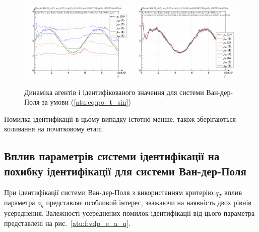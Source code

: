 \begin{figure}[ht!]
\begin{center}
  \includegraphics[width=0.49\textwidth]{p/cha/vdp/vdp_id-p_t_pi_ql3rlWvnAAW_sin.png}
  \hfill
  \includegraphics[width=0.49\textwidth]{p/cha/vdp/vdp_id-p_t_p_ql3rlWvnAAW_sin.png}
\end{center}
\caption{Динаміка агентів і ідентифікованого значення для системи Ван-дер-Поля за умови (\ref{atu:eq:po_t_sin})}
\label{atu:f:vdp_id1_sin}
\end{figure}

Помилка ідентифікації в цьому випадку істотно менше, також
зберігаються коливання на початковому етапі.



\subsection{Вплив параметрів системи ідентифікації на похибку ідентифікації для системи Ван-дер-Поля} %

При ідентифікації системи Ван-дер-Поля з використанням критерію
$q_T$ вплив параметра
$a_q$ представляє особливий інтерес, зважаючи на наявність двох
рівнів усереднення. Залежності усереднених помилок ідентифікації
від цього параметра представлені на рис.~\ref{atu:f:vdp_e_a_q}.

